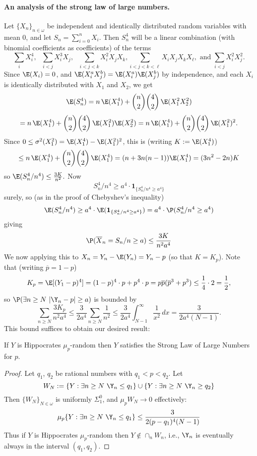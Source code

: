 \paragraph{An analysis of the strong law of large numbers.} Let $\{X_n\}_{n\in\omega}$ be independent and identically distributed random variables with mean 0, and let $S_n=\sum_{i=0}^n X_i$. Then $S_n^4$ will be a linear combination (with binomial coefficients as coefficients) of the terms
\[
\sum_i X_i^4, \text{ }
\sum_{i<j} X^3_iX_j, \text{  }
\sum_{i<j<k} X_i^2 X_j X_k,
\sum_{i<j<k<\ell} X_i X_j X_k X_\ell, \text{ and } \sum_{i<j} X_i^2 X_j^2.
\]
Since $\E(X_i)=0$, and $\E(X_i^aX_j^b)=\E(X_i^a)\E(X_j^b)$ by independence, and each $X_i$ is identically distributed with $X_1$ and $X_2$, we get 
\[
\E(S_n^4) = n \,\E(X_1^4) + {n\choose 2}{4\choose 2} \,\E(X_1^2X_2^2)
\]
\[
= n \,\E(X_1^4) + {n\choose 2}{4\choose 2} \,\E(X_1^2)\E(X_2^2)
= n \,\E(X_1^4) + {n\choose 2}{4\choose 2} \,\E(X_1^2)^2.
\]
Since $0\le\sigma^2(X_1^2) = \E(X_1^4)-\E(X_1^2)^2$, this is (writing $K:=\E(X_1^4)$)
\[
\le  n \,\E(X_1^4) + {n\choose 2}{4\choose 2} \,\E(X_1^4) = (n+3n(n-1)) \E(X_1^4) = (3n^2-2n) K
\]
so 
$%
\E(S_n^4/n^4) \le \frac{3K}{n^2}.
$ %
 Now 
\[
S_n^4/n^4 \ge a^4 \cdot \mathbf 1_{\{S_n^4/n^4\ge a^4\}}
\]
surely, so (as in the proof of Chebyshev's inequality)
\[
\E(S_n^4/n^4) \ge a^4 \cdot \E(\mathbf 1_{\{S_n^4/n^4\ge a^4\}}) = a^4\cdot \P( S_n^4/n^4\ge a^4)
\]
giving
\[
\P(\overline X_n = S_n/n \ge a) \le \frac{3K}{n^2 a^{4}}
\]
We now applying this to $X_n=Y_n-\E(Y_n) = Y_n - p$ (so that $K=K_p$). Note that (writing $\overline p=1-p$)
\[
K_p=\E[(Y_1-p)^4] = (1-p)^4\cdot p + p^4\cdot p = p\overline p ({\overline p}^3+p^3) \le \frac{1}{4}\cdot 2 = \frac{1}{2},
\]
so $\P(\exists n\ge N\,\, |\Y_n-p|\ge a)$ is bounded by 
\[
\sum_{n\ge N} \frac{3K_p}{n^2 a^4} \le \frac{3}{2a^4} \sum_{n\ge N} \frac{1}{n^2}
\le \frac{3}{2a^4} \int_{N-1}^\infty \frac{1}{x^2}\,dx = \frac{3}{2a^4(N-1)}.
\]
This bound suffices to obtain our desired result:

\begin{theorem}\label{heartless}
If $Y$ is Hippocrates $\mu_p$-random then $Y$ satisfies the Strong Law of Large Numbers for $p$.
\end{theorem}
\begin{proof}
Let $q_1$, $q_2$ be rational numbers with $q_1<p<q_2$.
Let
\[
W_N:=\{Y: \exists n\ge N\,\,\Y_n\le q_1\}\cup\{Y: \exists n\ge N\,\,\Y_n\ge q_2\}
\]
Then $\{W_N\}_{N\in\omega}$ is uniformly $\Sigma^0_1$, and $\mu_p W_N\to 0$ effectively:
\[\mu_p \{Y: \exists n\ge N\,\,\Y_n\le q_1\} \le \frac{3}{2(p-q_1)^4(N-1)}\]
Thus if $Y$ is Hippocrates $\mu_p$-random then $Y\not\in\cap_n W_n$, i.e., $\Y_n$ is eventually always in the interval $(q_1,q_2)$. 
\end{proof}



